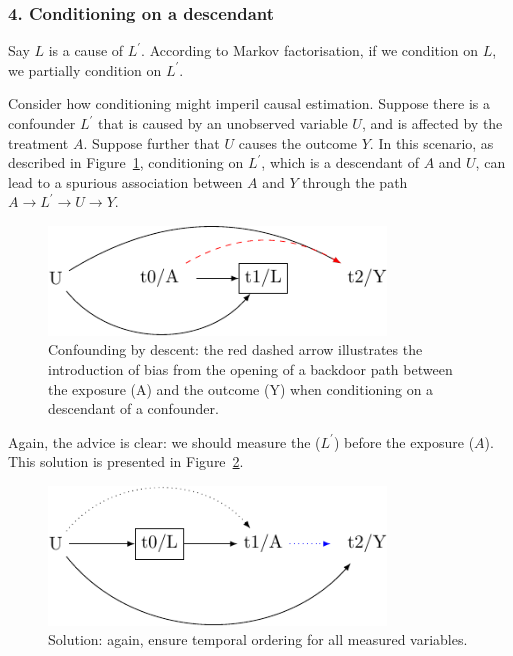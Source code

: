 \documentclass[
  singlecolumn]{article}
\begin{document}
\hypertarget{conditioning-on-a-descendant}{%
\subsubsection{4. Conditioning on a
descendant}\label{conditioning-on-a-descendant}}

Say \(L\) is a cause of \(L^\prime\). According to Markov factorisation,
if we condition on \(L\), we partially condition on \(L^\prime\).

Consider how conditioning might imperil causal estimation. Suppose there
is a confounder \(L^\prime\) that is caused by an unobserved variable
\(U\), and is affected by the treatment \(A\). Suppose further that
\(U\) causes the outcome \(Y\). In this scenario, as described in
Figure~\ref{fig-dag-descendent}, conditioning on \(L^\prime\), which is
a descendant of \(A\) and \(U\), can lead to a spurious association
between \(A\) and \(Y\) through the path \(A \to L^\prime \to U \to Y\).

\begin{figure}

{\centering \includegraphics[width=0.8\textwidth,height=\textheight]{causal-dags_files/figure-pdf/fig-dag-descendent-1.pdf}

}

\caption{\label{fig-dag-descendent}Confounding by descent: the red
dashed arrow illustrates the introduction of bias from the opening of a
backdoor path between the exposure (A) and the outcome (Y) when
conditioning on a descendant of a confounder.}

\end{figure}

Again, the advice is clear: we should measure the (\(L^\prime\)) before
the exposure (\(A\)). This solution is presented in
Figure~\ref{fig-dag-descendent-solution}.

\begin{figure}

{\centering \includegraphics[width=0.8\textwidth,height=\textheight]{causal-dags_files/figure-pdf/fig-dag-descendent-solution-1.pdf}

}

\caption{\label{fig-dag-descendent-solution}Solution: again, ensure
temporal ordering for all measured variables.}

\end{figure}
\end{document}
